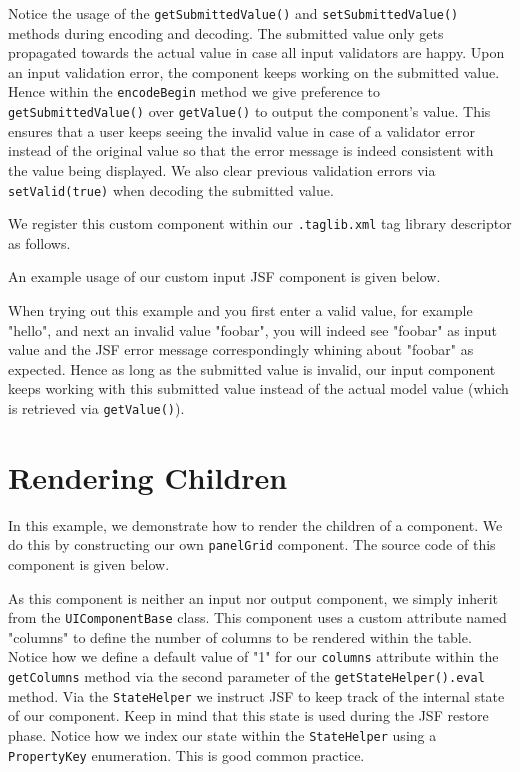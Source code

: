Notice the usage of the \texttt{getSubmittedValue()} and \texttt{setSubmittedValue()} methods during encoding and decoding.
The submitted value only gets propagated towards the actual value in case all input validators are happy.
Upon an input validation error, the component keeps working on the submitted value.
Hence within the \texttt{encodeBegin} method we give preference to \texttt{getSubmittedValue()} over \texttt{getValue()} to output the component's value.
This ensures that a user keeps seeing the invalid value in case of a validator error instead of the original value so that the error message is indeed consistent with the value being displayed.
We also clear previous validation errors via \texttt{setValid(true)} when decoding the submitted value.

We register this custom component within our \texttt{.taglib.xml} tag library descriptor as follows.


An example usage of our custom input JSF component is given below.

When trying out this example and you first enter a valid value, for example "hello", and next an invalid value "foobar", you will indeed see "foobar" as input value and the JSF error message correspondingly whining about "foobar" as expected.
Hence as long as the submitted value is invalid, our input component keeps working with this submitted value instead of the actual model value (which is retrieved via \texttt{getValue()}).

\section{Rendering Children}
In this example, we demonstrate how to render the children of a component.
We do this by constructing our own \texttt{panelGrid} component.
The source code of this component is given below.

As this component is neither an input nor output component, we simply inherit from the \texttt{UIComponentBase} class.
This component uses a custom attribute named "columns" to define the number of columns to be rendered within the table.
Notice how we define a default value of "1" for our \texttt{columns} attribute within the \texttt{getColumns} method via the second parameter of the \texttt{getStateHelper().eval} method.
Via the \texttt{StateHelper} we instruct JSF to keep track of the internal state of our component.
Keep in mind that this state is used during the JSF restore phase.
Notice how we index our state within the \texttt{StateHelper} using a \texttt{PropertyKey} enumeration.
This is good common practice.

